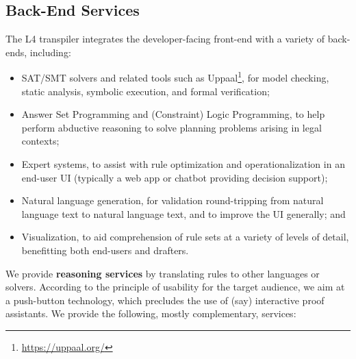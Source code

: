 \documentclass[runningheads]{llncs}
\begin{document}
\subsection{Back-End Services}\label{sec:services}

The L4 transpiler integrates the developer-facing front-end with a variety of back-ends, including:
\begin{itemize}
\item SAT/SMT solvers and related tools such as Uppaal\footnote{\url{https://uppaal.org/}}, for model checking, static analysis, symbolic execution, and formal verification;
\item Answer Set Programming and (Constraint) Logic Programming, to help perform abductive reasoning to solve planning problems arising in legal contexts;
\item Expert systems, to assist with rule optimization and operationalization in an end-user UI (typically a web app or chatbot providing decision support);
\item Natural language generation, for validation round-tripping from natural language text to natural language text, and to improve the UI generally; and
\item Visualization, to aid comprehension of rule sets at a variety of levels of detail, benefitting both end-users and drafters.
\end{itemize}

We provide \textbf{reasoning services} by translating rules to other languages or
solvers. According to the principle of usability for the target audience, we
aim at a push-button technology, which precludes the use of (say) interactive
proof assistants. We provide the following, mostly complementary, services:
\end{document}
